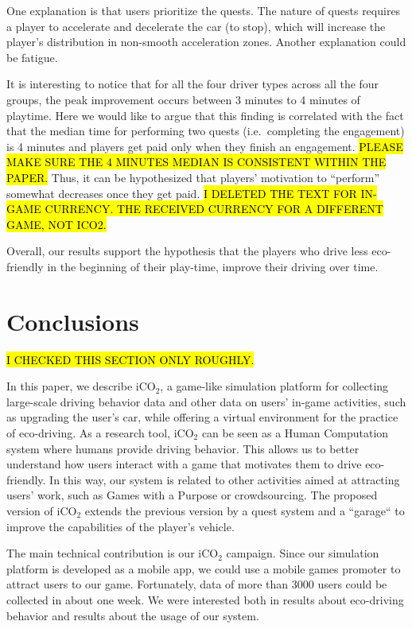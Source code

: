 \documentclass[preprint,authoryear,12pt]{elsarticle}
\begin{document}
 One explanation is that users prioritize the quests. The nature of quests requires a player to accelerate and decelerate the car (to stop), which will increase the player's distribution in non-smooth acceleration zones. %
 Another explanation could be fatigue. 
 
 It is interesting to notice that for all the four driver types across all the four groups, the peak improvement occurs between 3 minutes to 4 minutes of playtime. Here we would like to argue that this finding is correlated with the fact that the median time for performing two quests (i.e.~completing the engagement) is 4 minutes and players get paid only when they finish an engagement. \hl{PLEASE MAKE SURE THE 4 MINUTES MEDIAN IS CONSISTENT WITHIN THE PAPER.} Thus, it can be hypothesized that players' motivation to ``perform'' somewhat decreases once they get paid.
\hl{I DELETED THE TEXT FOR IN-GAME CURRENCY. THE RECEIVED CURRENCY FOR A DIFFERENT GAME, NOT ICO2.}

Overall, our results support the hypothesis that the players who drive less eco-friendly in the beginning of their play-time, improve their driving over time.



\section{Conclusions} \label{sec:conclusions}

\hl{I CHECKED THIS SECTION ONLY ROUGHLY.}

In this paper, we describe iCO$_2$, a game-like simulation platform for collecting large-scale driving behavior data and other data on users' in-game activities, such as upgrading the user's car, while offering a virtual environment for the practice of eco-driving. As a research tool, iCO$_2$ can be seen as a Human Computation system where humans provide driving behavior. This allows us to better understand how users interact with a game that motivates them to drive eco-friendly. In this way, our system is related to other activities aimed at attracting users' work, such as Games with a Purpose or crowdsourcing. The proposed version of iCO$_2$ extends the previous version \citep{prendingeroliveira2014} by a quest system and a ``garage`` to improve the capabilities of the player's vehicle.

The main technical contribution is our iCO$_2$ campaign. Since our simulation platform is developed as a mobile app, we could use a mobile games promoter to attract users to our game. Fortunately, data of more than 3000 users could be collected in about one week. We were interested both in results about eco-driving behavior and results about the usage of our system.
\end{document}
